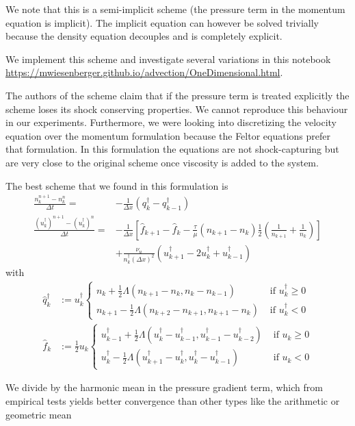 We note that this is a semi-implicit scheme (the pressure term in the momentum equation is implicit). The implicit equation can however be solved trivially because
the density equation decouples and is completely explicit.

We implement this scheme and investigate several variations in this notebook
\url{https://mwiesenberger.github.io/advection/OneDimensional.html}.

The authors of the scheme claim that if the pressure term is treated explicitly the
scheme loses its shock conserving properties. We cannot reproduce this behaviour
in our experiments. Furthermore, we were looking into discretizing the
velocity equation over the momentum formulation because the Feltor equations
prefer that formulation. In this formulation the equations are not shock-capturing
but are very close to the original scheme once viscosity is added to the system.

The best scheme that we found in this formulation is
\begin{align}
    \frac{n_k^{n+1} - n_k^n}{\Delta t} = &- \frac{1}{\Delta x}(q^\dagger_k  - q^\dagger_{k-1}) \\
    \frac{(u_k^\dagger)^{n+1}-(u_k^\dagger)^{n}}{\Delta t} = &- \frac{1}{\Delta
    x} \left[ \hat f_{k+1} -\hat f_k -
        \frac{\tau}{\mu} \left(n_{k+1} - n_k\right) \frac{1}{2}\left(\frac{1}{n_{k+1}}
    +\frac{1}{n_k}\right)\right]
    \nonumber\\
    &+ \frac{\nu_u}{n^\dagger_k (\Delta x)^2}
    \left(u^\dagger_{k+1} - 2 u^\dagger_k + u^\dagger_{k-1}\right)
\end{align}
with
\begin{align}
    \hat q^\dagger_k &:= u^\dagger_k \begin{cases}
        n_k     + \frac{1}{2}\Lambda( n_{k+1}-n_k    , n_k - n_{k-1})&\text{ if } u^\dagger_k \geq 0 \\
        n_{k+1} - \frac{1}{2}\Lambda( n_{k+2}-n_{k+1}, n_{k+1} - n_k)&\text{ if } u^\dagger_k < 0
    \end{cases}
    \\
    \hat f_k &:= \frac{1}{2}u_k \begin{cases}
        u^\dagger_{k-1} + \frac{1}{2}\Lambda( u^\dagger_{k}-u^\dagger_{k-1}, u^\dagger_{k-1} - u^\dagger_{k-2})&\text{ if } u_k \geq 0 \\
        u^\dagger_k     - \frac{1}{2}\Lambda( u^\dagger_{k+1}-u^\dagger_k    , u^\dagger_k - u^\dagger_{k-1})&\text{ if } u_k < 0
    \end{cases}
\end{align}
\begin{tcolorbox}[title=Note]
    We divide by the harmonic mean in the pressure gradient term, which from empirical tests
    yields better convergence than other types like the arithmetic
    or geometric mean
\end{tcolorbox}
